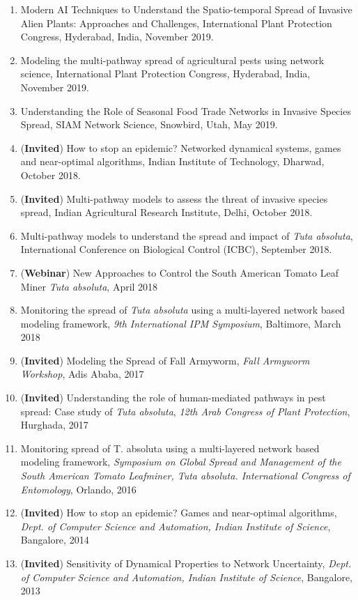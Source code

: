 \documentclass[margin,10pt]{res}
\begin{document}
\begin{resume}
\begin{enumerate}[1.]
Applications, Indian Institute of Technology, Hyderabad, India,
November 2019.
\item Modern AI Techniques to Understand the Spatio-temporal Spread of
Invasive Alien Plants: Approaches and Challenges, International Plant
Protection Congress, Hyderabad, India, November 2019.
\item Modeling the multi-pathway spread of agricultural pests using
network science, International Plant Protection Congress, Hyderabad,
India, November 2019.
\item Understanding the Role of Seasonal Food Trade Networks in Invasive
Species Spread, SIAM Network Science, Snowbird, Utah,
May 2019.
\item (\textbf{Invited}) How to stop an epidemic? Networked dynamical
systems, games and near-optimal algorithms, Indian Institute of
Technology, Dharwad, October 2018.
\item (\textbf{Invited}) Multi-pathway models to assess the threat of
invasive species spread, Indian Agricultural Research Institute, Delhi,
October 2018.
\item Multi-pathway models to understand the spread and impact of
\emph{Tuta
absoluta}, International Conference on Biological Control (ICBC),
September 2018.
\item (\textbf{Webinar}) New Approaches to Control the South American Tomato
Leaf Miner \emph{Tuta absoluta}, April 2018
\item Monitoring the spread of {\it Tuta absoluta} using a
multi-layered network based modeling framework, \emph{9th International
IPM Symposium}, Baltimore, March 2018
    \item (\textbf{Invited}) Modeling the Spread of Fall Armyworm,
    \emph{Fall Armyworm Workshop}, Adis Ababa, 2017
    \item (\textbf{Invited}) Understanding the role of human-mediated
    pathways in pest spread: Case study of \emph{Tuta absoluta}, \emph{12th
    Arab Congress of Plant Protection}, Hurghada, 2017
\item Monitoring spread of T. absoluta using a multi-layered network
based modeling framework, \emph{Symposium on Global Spread and Management
of the South American Tomato Leafminer, Tuta absoluta. International
Congress of Entomology}, Orlando, 2016
\item (\textbf{Invited}) How to stop an epidemic?  Games and near-optimal
algorithms, \emph{Dept. of Computer Science and Automation, Indian
Institute of Science}, Bangalore, 2014
\item (\textbf{Invited}) Sensitivity of Dynamical Properties to Network
Uncertainty, \emph{Dept. of Computer Science and Automation, Indian
Institute of Science}, Bangalore, 2013
\end{enumerate}


\end{resume}
\end{document}
